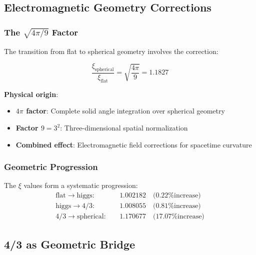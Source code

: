 \documentclass[12pt,a4paper]{article}
\newcommand{\xipar}{\ensuremath{\xi}}
\newcommand{\mypi}{\ensuremath{\pi}}
\newcommand{\myrightarrow}{\ensuremath{\rightarrow}}
\begin{document}
	\subsection{Electromagnetic Geometry Corrections}
	\label{subsec:em_corrections}
	
	\subsubsection[The Square Root Factor]{The $\sqrt{4\mypi/9}$ Factor}
	\label{subsubsec:correction_factor}
	
	The transition from flat to spherical geometry involves the correction:
	
	\begin{equation}
		\frac{\xipar_{\text{spherical}}}{\xipar_{\text{flat}}} = \sqrt{\frac{4\mypi}{9}} = 1.1827
		\label{eq:em_correction}
	\end{equation}
	
	\textbf{Physical origin}:
	\begin{itemize}
		\item \textbf{$4\mypi$ factor}: Complete solid angle integration over spherical geometry
		\item \textbf{Factor $9 = 3^2$}: Three-dimensional spatial normalization
		\item \textbf{Combined effect}: Electromagnetic field corrections for spacetime curvature
	\end{itemize}
	
	\subsubsection{Geometric Progression}
	\label{subsubsec:geometric_progression}
	
	The $\xi$ values form a systematic progression:
	\begin{align}
		\text{flat} \myrightarrow \text{higgs}: \quad &1.002182 \quad \text{(0.22\% increase)} \\
		\text{higgs} \myrightarrow \text{4/3}: \quad &1.008055 \quad \text{(0.81\% increase)} \\
		\text{4/3} \myrightarrow \text{spherical}: \quad &1.170677 \quad \text{(17.07\% increase)}
	\end{align}
	
	\subsection{4/3 as Geometric Bridge}
	\label{subsec:four_thirds_bridge}
	
\end{document}

